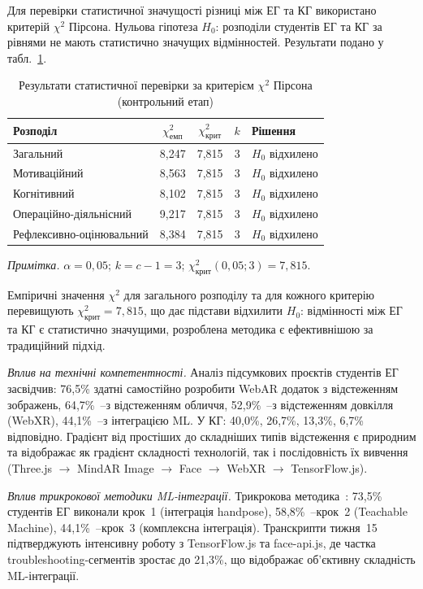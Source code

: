 Для перевірки статистичної значущості різниці між ЕГ та КГ використано критерій $\chi^2$ Пірсона. Нульова гіпотеза $H_0$: розподіли студентів ЕГ та КГ за рівнями не мають статистично значущих відмінностей. Результати подано у табл.~\ref{tab:chi2_summary}.

\begin{table}[!h]
\caption{Результати статистичної перевірки за критерієм $\chi^2$ Пірсона (контрольний етап)}
\label{tab:chi2_summary}
\centering
\small
\begin{tabular}{|l|c|c|c|l|}
\hline
\textbf{Розподіл} & $\chi^2_{\text{емп}}$ & $\chi^2_{\text{крит}}$ & $k$ & \textbf{Рішення} \\
\hline
Загальний & 8,247 & 7,815 & 3 & $H_0$ відхилено \\
\hline
Мотиваційний & 8,563 & 7,815 & 3 & $H_0$ відхилено \\
\hline
Когнітивний & 8,102 & 7,815 & 3 & $H_0$ відхилено \\
\hline
Операційно-діяльнісний & 9,217 & 7,815 & 3 & $H_0$ відхилено \\
\hline
Рефлексивно-оцінювальний & 8,384 & 7,815 & 3 & $H_0$ відхилено \\
\hline
\end{tabular}

\medskip
\footnotesize
\textit{Примітка.} $\alpha = 0{,}05$; $k = c - 1 = 3$; $\chi^2_{\text{крит}}(0{,}05; 3) = 7{,}815$.
\end{table}

Емпіричні значення $\chi^2$ для загального розподілу та для кожного критерію перевищують $\chi^2_{\text{крит}} = 7{,}815$, що дає підстави відхилити $H_0$: відмінності між ЕГ та КГ є статистично значущими, розроблена методика є ефективнішою за традиційний підхід.


\textit{Вплив на технічні компетентності.} Аналіз підсумкових проєктів студентів ЕГ засвідчив: 76,5\% здатні самостійно розробити WebAR додаток з відстеженням зображень, 64,7\%~--з відстеженням обличчя, 52,9\%~--з відстеженням довкілля (WebXR), 44,1\%~--з інтеграцією ML. У КГ: 40,0\%, 26,7\%, 13,3\%, 6,7\% відповідно. Градієнт від простіших до складніших типів відстеження є природним та відображає як градієнт складності технологій, так і послідовність їх вивчення (Three.js $\to$ MindAR Image $\to$ Face $\to$ WebXR $\to$ TensorFlow.js).

\textit{Вплив трикрокової методики ML-інтеграції.} Трикрокова методика~\cite{Semerikov2024WebARML_CoSinE, Semerikov2024WebAR_EduDim}: 73,5\% студентів ЕГ виконали крок~1 (інтеграція handpose), 58,8\%~--крок~2 (Teachable Machine), 44,1\%~--крок~3 (комплексна інтеграція). Транскрипти тижня~15 підтверджують інтенсивну роботу з TensorFlow.js та face-api.js, де частка troubleshooting-сегментів зростає до 21,3\%, що відображає об'єктивну складність ML-інтеграції.

